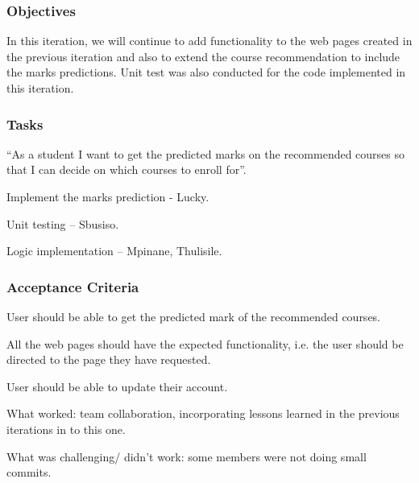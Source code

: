 \documentclass[10pt]{article}
\begin{document}
\subsubsection{Objectives}

In this iteration, we will continue to add functionality to the web pages created in the previous iteration and also to extend the course recommendation to include the marks predictions. Unit test was also conducted for the code implemented in this iteration.

\subsubsection{Tasks}

“As a student I want to get the predicted marks on the recommended courses so that I can decide on which courses to enroll for”.

\begin{description}[font=$\bullet$~\normalfont\scshape\color{red!50!black}]

\item [] Implement the marks prediction - Lucky.
\item [] Unit testing – Sbusiso.
\item [] Logic implementation – Mpinane, Thulisile.

\end{description}

\subsubsection{Acceptance Criteria}

\begin{description}[font=$\bullet$~\normalfont\scshape\color{red!50!black}]

\item [] User should be able to get the predicted mark of the recommended courses.
\item [] All the web pages should have the expected functionality, i.e.  the user should be directed to the page they have requested. 
\item [] User should be able to update their account.

\end{description}

What worked: team collaboration, incorporating lessons learned in the previous iterations in to this one.

What was challenging/ didn’t work: some members were not doing small commits.
\end{document}
